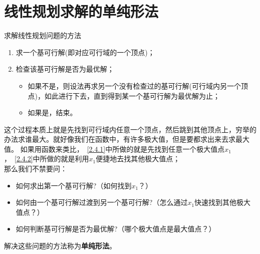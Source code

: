     \section{线性规划求解的单纯形法}
    \label{2.4}
    \begin{notebox}{求解线性规划问题的方法}
        \begin{enumerate}
            \item 求一个基可行解(即对应可行域的一个顶点)；
            \item 检查该基可行解是否为最优解；
            \begin{itemize}
                \item 如果不是，则设法再求另一个没有检查过的基可行解(可行域内另一个顶点)，如此进行下去，直到得到某一个基可行解为最优解为止；
                \item 如果是，结束。
            \end{itemize}
        \end{enumerate}
    \end{notebox}
    这个过程本质上就是先找到可行域内任意一个顶点，然后跳到其他顶点上，穷举的办法求谁最大。就好像我们在函数中，有许多极大值，但是要都求出来去求最大值。
    如果用函数来类比，~\ref{2.4.1}中所做的就是先找到任意一个极大值点$x_1$，~\ref{2.4.2}中所做的就是利用$x_1$便捷地去找其他极大值点；
    \\那么我们不禁要问：
    \begin{itemize}
        \item 如何求出第一个基可行解?（如何找到$x_1$？）
        \item 如何由一个基可行解过渡到另一个基可行解?（怎么通过$x_1$快速找到其他极大值点？）
        \item 如何判断基可行解是否为最优解?（哪个极大值点是最大值点？）
    \end{itemize}
    解决这些问题的方法称为\textbf{单纯形法}。
